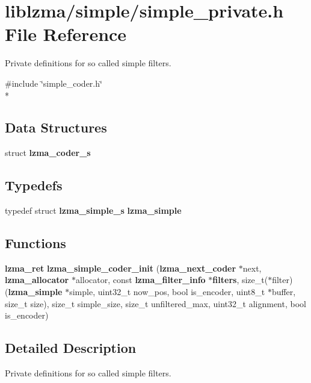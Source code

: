 \section{liblzma/simple/simple\-\_\-private.h File Reference}
\label{simple__private_8h}


Private definitions for so called simple filters.  


{\ttfamily \#include \char`\"{}simple\-\_\-coder.\-h\char`\"{}}\\*
\subsection*{Data Structures}
\begin{DoxyCompactItemize}
\item 
struct {\bf lzma\-\_\-coder\-\_\-s}
\end{DoxyCompactItemize}
\subsection*{Typedefs}
\begin{DoxyCompactItemize}
\item 
typedef struct {\bf lzma\-\_\-simple\-\_\-s} {\bfseries lzma\-\_\-simple}\label{simple__private_8h_a0539b69d3c77c76d0c91cfd6abd4c3f1}

\end{DoxyCompactItemize}
\subsection*{Functions}
\begin{DoxyCompactItemize}
\item 
{\bf lzma\-\_\-ret} {\bfseries lzma\-\_\-simple\-\_\-coder\-\_\-init} ({\bf lzma\-\_\-next\-\_\-coder} $\ast$next, {\bf lzma\-\_\-allocator} $\ast$allocator, const {\bf lzma\-\_\-filter\-\_\-info} $\ast${\bf filters}, size\-\_\-t($\ast$filter)({\bf lzma\-\_\-simple} $\ast$simple, uint32\-\_\-t now\-\_\-pos, bool is\-\_\-encoder, uint8\-\_\-t $\ast$buffer, size\-\_\-t size), size\-\_\-t simple\-\_\-size, size\-\_\-t unfiltered\-\_\-max, uint32\-\_\-t alignment, bool is\-\_\-encoder)\label{simple__private_8h_af73e8b02551134d6e2a157c41ecea164}

\end{DoxyCompactItemize}


\subsection{Detailed Description}
Private definitions for so called simple filters. 